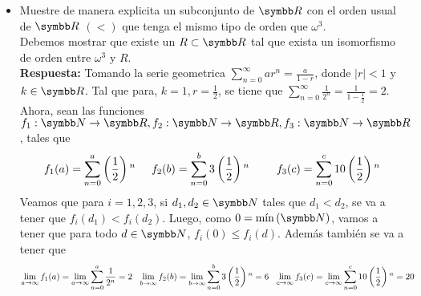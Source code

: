 \documentclass{article}
\begin{document}
\maketitle

\begin{itemize} 
    \item Muestre de manera explicita un subconjunto de \(\realR{}\) con el orden usual de \(\realR{}\) \(\left(<\right)\) que tenga el mismo tipo de orden que \(\omega^{3}\). \\
        Debemos mostrar que existe un \(R \subset \realR\) tal que exista un isomorfismo de orden entre \(\omega^3\) y \(R\).
        \\
        \textbf{Respuesta: } 
        Tomando la serie geometrica 
        \(
            \sum_{n=0}^{\infty} ar^n = \frac{a}{1-r}
        \), 
        donde \(\left|r\right| < 1\) y \(k \in \realR\). Tal que para, \(k = 1, r = \frac{1}{2}\), se tiene que \(\sum_{n=0}^{\infty}\frac{1}{2^n} = \frac{1}{1 - \frac{1}{2}} = 2\).
        Ahora, sean las funciones \(f_1: \realN \rightarrow \realR, f_2: \realN \rightarrow \realR, f_3: \realN \rightarrow \realR\), tales que 
        \[
            \begin{aligned}
                f_1(a) = \sum_{n=0}^{a} \left(\frac{1}{2}\right){}^{n} &
                \hspace{0.5cm}
                f_2(b) = \sum_{n=0}^{b} 3\left(\frac{1}{2}\right){}^{n} &
                \hspace{0.5cm}
                f_3(c) = \sum_{n=0}^{c} 10\left(\frac{1}{2}\right){}^{n}
            \end{aligned}
        \]
        Veamos que para \(i = 1, 2, 3\), si \(d_1, d_2 \in \realN\) tales que \(d_1 < d_2\), se va a tener que \(f_i(d_1) < f_i(d_2)\).
        Luego, como \(0 = \text{mín}\left(\realN\right)\), vamos a tener que para todo \(d \in \realN\), \(f_i(0) \leq f_i(d)\). 
        Además también se va a tener que 
        \[
            \begin{aligned}
                \lim_{a \rightarrow \infty} f_1(a) = \lim_{a \rightarrow \infty}\sum_{n=0}^{a} \frac{1}{2^{n}} = 2&
                \hspace{0.25cm}
                \lim_{b \rightarrow \infty} f_2(b) = \lim_{b \rightarrow \infty}\sum_{n=0}^{b} 3\left(\frac{1}{2}\right){}^{n} = 6
                \hspace{0.25cm}
                \lim_{c \rightarrow \infty} f_3(c) = \lim_{c \rightarrow \infty}\sum_{n=0}^{c} 10\left(\frac{1}{2}\right){}^{n} = 20

\end{aligned}\]
\end{itemize}
\end{document}
